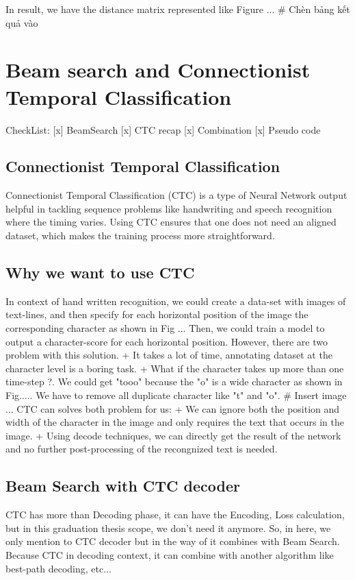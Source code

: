       In result, we have the distance matrix represented like Figure ...
      # Chèn bảng kết quả vào
  
  \section{ Beam search and Connectionist Temporal Classification }
    CheckList:
      [x] BeamSearch
      [x] CTC recap
      [x] Combination
      [x] Pseudo code
      \subsection{ Connectionist Temporal Classification }
      Connectionist Temporal Classification (CTC) is a type of Neural Network output helpful
      in tackling sequence problems like handwriting and speech recognition where the timing varies.
      Using CTC ensures that one does not need an aligned dataset, which makes the training process
      more straightforward.
      \subsection{ Why we want to use CTC }
        In context of hand written recognition, we could create a data-set with
        images of text-lines, and then specify for each horizontal position of the image
        the corresponding character as shown in Fig ... Then, we could train a model to output
        a character-score for each horizontal position. However, there are two problem with this
        solution.
          + It takes a lot of time, annotating dataset at the character level is a boring task.
          + What if the character takes up more than one time-step ?. We could get "tooo" because
          the "o" is a wide character as shown in Fig..... We have to remove all duplicate character
          like "t" and "o".
          # Insert image ...
        CTC can solves both problem for us:
          + We can ignore both the position and width of the character in the image
          and only requires the text that occurs in the image.
          + Using decode techniques, we can directly get the result of the network and
          no further post-processing of the recongnized text is needed. 

    \subsection{ Beam Search with CTC decoder }
      CTC has more than Decoding phase, it can have the Encoding, Loss calculation, but in
      this graduation thesis scope, we don't need it anymore. So, in here, we only
      mention to CTC decoder but in the way of it combines with Beam Search. Because CTC
      in decoding context, it can combine with another algorithm like best-path decoding, etc...

